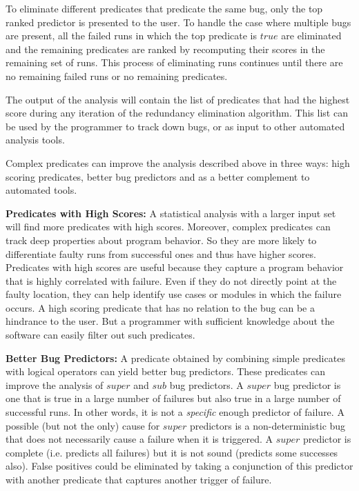 To eliminate different predicates that predicate the same bug, only the top ranked predictor is presented to the user.  To handle the case where multiple bugs are present, all the failed runs in which the top predicate is $true$ are eliminated and the remaining predicates are ranked by recomputing their scores in the remaining set of runs.  This process of eliminating runs continues until there are no remaining failed runs or no remaining predicates.  

The output of the analysis will contain the list of predicates that had the highest score during any iteration of the redundancy elimination algorithm.  This list can be used by the programmer to track down bugs, or as input to other automated analysis tools.
 
Complex predicates can improve the analysis described above in three ways: high scoring predicates, better bug predictors and as a better complement to automated tools.

\vspace{4pt} \noindent
{\bf Predicates with High Scores:} A statistical analysis with a larger input set will find more predicates with high scores.  Moreover, complex predicates can track deep properties about program behavior.  So they are more likely to differentiate faulty runs from successful ones and thus have higher scores.  Predicates with high scores are useful because they capture a program behavior that is highly correlated with failure.  Even if they do not directly point at the faulty location, they can help identify use cases or modules in which the failure occurs.  A high scoring predicate that has no relation to the bug can be a hindrance to the user.  But a programmer with sufficient knowledge about the software can easily filter out such predicates.

\vspace{4pt} \noindent
{\bf Better Bug Predictors:} A predicate obtained by combining simple predicates with logical operators can yield better bug predictors.  These predicates can improve the analysis of $super$ and $sub$ bug predictors.  A $super$ bug predictor is one that is true in a large number of failures but also true in a large number of successful runs.  In other words, it is not a {\em specific} enough predictor of failure.  A possible (but not the only) cause for $super$ predictors is a non-deterministic bug that does not necessarily cause a failure when it is triggered.  A $super$ predictor is complete (i.e. predicts all failures) but it is not sound (predicts some successes also).  False positives could be eliminated by taking a conjunction of this predictor with another predicate that captures another trigger of failure.

